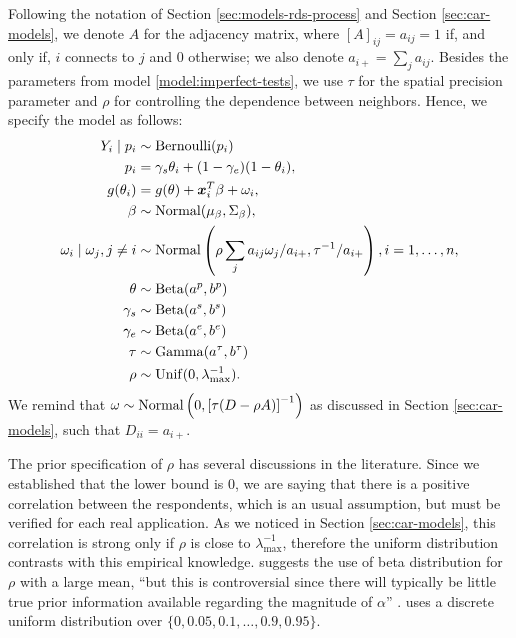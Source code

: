 Following the notation of Section \ref{sec:models-rds-process} and Section
\ref{sec:car-models}, we denote $A$ for the adjacency matrix, where $[A]_{ij}
=a_{ij} = 1$ if, and only if, $i$ connects to $j$ and $0$ otherwise; we also
denote $a_{i+} = \sum_j a_{ij}$. Besides the
parameters from model \ref{model:imperfect-tests}, we use $\tau$
for the spatial precision parameter and $\rho$ for controlling the dependence between neighbors. Hence, we specify
the model as follows:
\begin{equation}
  \label{model:imperfect-tests-rds}
  \begin{aligned}
    Y_i \mid p_i &\sim \operatorname{Bernoulli}(p_i) \\
    p_i &= \gamma_s\theta_i + (1-\gamma_e)(1 - \theta_i),  \\
    g(\theta_i) &= g(\theta) + \boldsymbol{x}_i^T\beta + \omega_i,  \\
    \beta  &\sim \operatorname{Normal}(\mu_{\beta}, \Sigma_{\beta}), \\ 
    \omega_i \mid \omega_j, j \neq i &\sim \operatorname{Normal}\left(\rho\sum_j a_{ij} \omega_j / a_{i+}, \tau^{-1} / a_{i+}\right), i = 1, \dots, n, 
    \\
    \theta &\sim \operatorname{Beta}(a^p, b^p) \\ 
    \gamma_s &\sim \operatorname{Beta}(a^s, b^s) \\
    \gamma_e &\sim \operatorname{Beta}(a^e, b^e) \\
    \tau &\sim \operatorname{Gamma}(a^{\tau}, b^{\tau}) \\
    \rho & \sim \operatorname{Unif}(0,\lambda_{\max}^{-1}).
  \end{aligned}  
\end{equation}
We remind that $\omega \sim \operatorname{Normal}\left(0, \left[\tau (D - \rho
A)\right]^{-1}\right)$ as discussed in Section \ref{sec:car-models}, such that
$D_{ii} = a_{i+}$. 

The prior specification of $\rho$ has several discussions in the literature.
Since we established that the lower bound is 0, we are saying that there is a
positive correlation between the respondents, which is an usual assumption,
but must be verified for each real application. As we noticed in Section
\ref{sec:car-models}, this correlation is strong only if $\rho$ is close to
$\lambda_{\max}^{-1}$, therefore the uniform distribution contrasts with
this empirical knowledge. \textcite[p. 177]{banerjee2003hierarchical} suggests
the use of beta distribution for $\rho$ with a large mean, ``but this is
controversial since there will typically be little true prior information
available regarding the magnitude of $\alpha$'' \cite[$\alpha$ is the
parameter $\rho$ in our notation.][p.
177]{banerjee2003hierarchical}. \textcite[p. 81]{lee2011comparison} uses a
discrete uniform distribution over $\{0, 0.05, 0.1, \dots, 0.9, 0.95\}$. 

